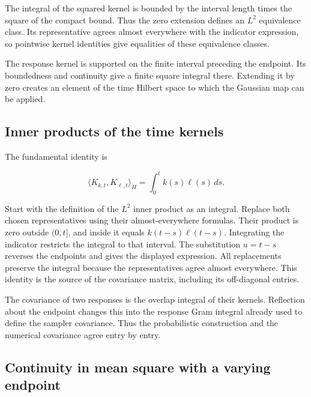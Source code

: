 \documentclass[11pt,a4paper]{report}
\begin{document}
The integral of the squared kernel is bounded by the interval length times the square of the compact bound. Thus the zero extension defines an \(L^{2}\) equivalence class. Its representative agrees almost everywhere with the indicator expression, so pointwise kernel identities give equalities of these equivalence classes.



The response kernel is supported on the finite interval preceding the endpoint. Its boundedness and continuity give a finite square integral there. Extending it by zero creates an element of the time Hilbert space to which the Gaussian map can be applied.

\subsection{\texorpdfstring{Inner products of the time kernels}{Inner products of the time kernels}}
\label{report-step-KineticLangevin-BrownianConvolution-lean-3}


The fundamental identity is

\[\langle K_{k,t},K_{\ell,t}\rangle_H=\int_0^t k(s)\ell(s)\,ds.\]

Start with the definition of the \(L^{2}\) inner product as an integral. Replace both chosen representatives using their almost-everywhere formulas. Their product is zero outside \((0,t]\), and inside it equals \(k(t-s)\ell(t-s)\). Integrating the indicator restricts the integral to that interval. The substitution \(u=t-s\) reverses the endpoints and gives the displayed expression. All replacements preserve the integral because the representatives agree almost everywhere. This identity is the source of the covariance matrix, including its off-diagonal entries.



The covariance of two responses is the overlap integral of their kernels. Reflection about the endpoint changes this into the response Gram integral already used to define the sampler covariance. Thus the probabilistic construction and the numerical covariance agree entry by entry.

\subsection{\texorpdfstring{Continuity in mean square with a varying endpoint}{Continuity in mean square with a varying endpoint}}
\label{report-step-KineticLangevin-BrownianConvolution-lean-4}
\end{document}
